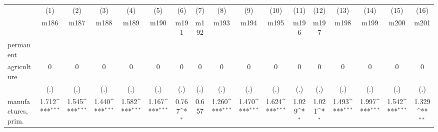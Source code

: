 {
\def\sym#1{\ifmmode^{#1}\else\(^{#1}\)\fi}
\begin{tabular}{l*{16}{c}}
\hline\hline
                    &\multicolumn{1}{c}{(1)}&\multicolumn{1}{c}{(2)}&\multicolumn{1}{c}{(3)}&\multicolumn{1}{c}{(4)}&\multicolumn{1}{c}{(5)}&\multicolumn{1}{c}{(6)}&\multicolumn{1}{c}{(7)}&\multicolumn{1}{c}{(8)}&\multicolumn{1}{c}{(9)}&\multicolumn{1}{c}{(10)}&\multicolumn{1}{c}{(11)}&\multicolumn{1}{c}{(12)}&\multicolumn{1}{c}{(13)}&\multicolumn{1}{c}{(14)}&\multicolumn{1}{c}{(15)}&\multicolumn{1}{c}{(16)}\\
                    &\multicolumn{1}{c}{m186}&\multicolumn{1}{c}{m187}&\multicolumn{1}{c}{m188}&\multicolumn{1}{c}{m189}&\multicolumn{1}{c}{m190}&\multicolumn{1}{c}{m191}&\multicolumn{1}{c}{m192}&\multicolumn{1}{c}{m193}&\multicolumn{1}{c}{m194}&\multicolumn{1}{c}{m195}&\multicolumn{1}{c}{m196}&\multicolumn{1}{c}{m197}&\multicolumn{1}{c}{m198}&\multicolumn{1}{c}{m199}&\multicolumn{1}{c}{m200}&\multicolumn{1}{c}{m201}\\
\hline
permanent           &                     &                     &                     &                     &                     &                     &                     &                     &                     &                     &                     &                     &                     &                     &                     &                     \\
agriculture         &           0         &           0         &           0         &           0         &           0         &           0         &           0         &           0         &           0         &           0         &           0         &           0         &           0         &           0         &           0         &           0         \\
                    &         (.)         &         (.)         &         (.)         &         (.)         &         (.)         &         (.)         &         (.)         &         (.)         &         (.)         &         (.)         &         (.)         &         (.)         &         (.)         &         (.)         &         (.)         &         (.)         \\
[1em]
manufactures, prim. &       1.712\sym{***}&       1.545\sym{***}&       1.440\sym{***}&       1.582\sym{***}&       1.167\sym{***}&       0.767\sym{*}  &       0.657         &       1.260\sym{***}&       1.470\sym{***}&       1.624\sym{***}&       1.029\sym{*}  &       1.021\sym{*}  &       1.493\sym{***}&       1.997\sym{***}&       1.542\sym{***}&       1.329\sym{**} \\

\end{tabular}}
